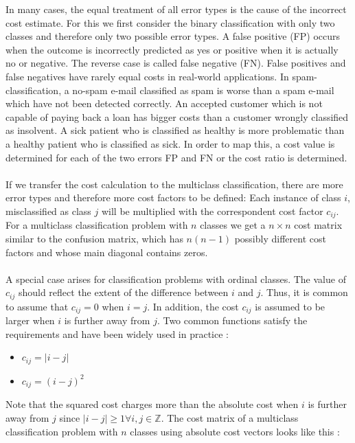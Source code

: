 \documentclass[article,type=msc,colorback,accentcolor=tud7b]{tudthesis}
\begin{document}
    In many cases, the equal treatment of all error types is the cause of the incorrect cost estimate. For this we first consider the binary classification with only two classes and therefore only two possible error types. A false positive (FP) occurs when the outcome is incorrectly predicted as yes or positive when it is actually no or negative. The reverse case is called false negative (FN). False positives and false negatives have rarely equal costs in real-world applications. In spam-classification, a no-spam e-mail classified as spam is worse than a spam e-mail which have not been detected correctly. An accepted customer which is not capable of paying back a loan has bigger costs than a customer wrongly classified as insolvent. A sick patient who is classified as healthy is more problematic than a healthy patient who is classified as sick. In order to map this, a cost value is determined for each of the two errors FP and FN or the cost ratio is determined. \\\\
    If we transfer the cost calculation to the multiclass classification, there are more error types and therefore more cost factors to be defined: Each instance of class $i$, misclassified as class $j$ will be multiplied with the correspondent cost factor $c_{ij}$. For a multiclass classification problem with $n$ classes we get a $n\times n$ cost matrix similar to the confusion matrix, which has $n(n-1)$ possibly different cost factors and whose main diagonal contains zeros. \\\\
    A special case arises for classification problems with ordinal classes. The value of $c_{ij}$ should reflect the extent of the difference between $i$ and $j$. Thus, it is common to assume that $c_{ij}=0$ when $i=j$. In addition, the cost $c_{ij}$ is assumed to be larger when $i$ is further away from $j$. Two common functions satisfy the requirements and have been widely used in practice \autocite[section~3.1]{Ruan2014}:
    \begin{itemize}
      \item {} $c_{ij}=\left|i-j\right|$
      \item {} $c_{ij}=\left(i-j\right)^{2}$
    \end{itemize}
    Note that the squared cost charges more than the absolute cost when $i$ is further away from $j$ since $\left|i-j\right|\geq1\forall i,j\in\mathbb{Z}$. The cost matrix of a multiclass classification problem with $n$ classes using absolute cost vectors looks like this \autocite[chapter~3]{Kotsiantis2004}:
\end{document}
